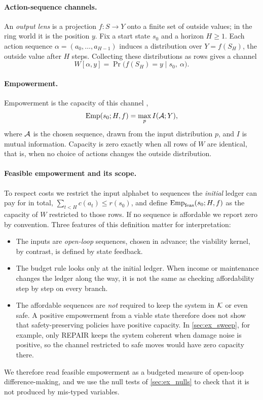 \paragraph{Action-sequence channels.}
An \emph{output lens} is a projection $f:S\to Y$ onto a finite set of outside values; in the ring world it is the position $y$. Fix a start state $s_0$ and a horizon $H\ge 1$. Each action sequence $\alpha=(a_0,\dots,a_{H-1})$ induces a distribution over $Y=f(S_H)$, the outside value after $H$ steps. Collecting these distributions as rows gives a channel
\[
W[\alpha,y] = \Pr\bigl(f(S_H)=y \mid s_0,\ \alpha\bigr).
\]

\paragraph{Empowerment.}
Empowerment \citep{klyubin2005} is the capacity of this channel \citep{shannon1948},
\[
\mathrm{Emp}(s_0;H,f) = \max_{p} I(\mathcal{A};Y),
\]
where $\mathcal{A}$ is the chosen sequence, drawn from the input distribution $p$, and $I$ is mutual information. Capacity is zero exactly when all rows of $W$ are identical, that is, when no choice of actions changes the outside distribution.

\paragraph{Feasible empowerment and its scope.}
To respect costs we restrict the input alphabet to sequences the \emph{initial} ledger can pay for in total, $\sum_{t<H} c(a_t)\le r(s_0)$, and define $\mathrm{Emp}_{\mathrm{feas}}(s_0;H,f)$ as the capacity of $W$ restricted to those rows. If no sequence is affordable we report zero by convention. Three features of this definition matter for interpretation:
\begin{itemize}[leftmargin=*, itemsep=0.2em]
  \item The inputs are \emph{open-loop} sequences, chosen in advance; the viability kernel, by contrast, is defined by state feedback.
  \item The budget rule looks only at the initial ledger. When income or maintenance changes the ledger along the way, it is not the same as checking affordability step by step on every branch.
  \item The affordable sequences are \emph{not} required to keep the system in $\mathcal{K}$ or even safe. A positive empowerment from a viable state therefore does not show that safety-preserving policies have positive capacity. In \cref{sec:ex_sweep}, for example, only REPAIR keeps the system coherent when damage noise is positive, so the channel restricted to safe moves would have zero capacity there.
\end{itemize}
We therefore read feasible empowerment as a budgeted measure of open-loop difference-making, and we use the null tests of \cref{sec:ex_nulls} to check that it is not produced by mis-typed variables.

